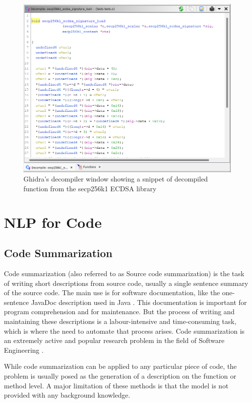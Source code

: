 \label{fig:decompiler}
\begin{figure}[H]
  \centering
  \includegraphics[width=\linewidth]{img/decompiler.png}
  \caption{Ghidra's decompiler window showing a snippet of decompiled function from the secp256k1 ECDSA library}
\end{figure}

\newpage
\section{NLP for Code}

\subsection{Code Summarization}
Code summarization (also referred to as Source code summarization) is the task of writing short descriptions from source code, usually a single sentence summary of the source code. The main use is for software documentation, like the one-sentence JavaDoc description used in Java \cite{leclair_recommendations}. This documentation is important for program comprehension and for maintenance. But the process of writing and maintaining these descriptions is a labour-intensive and time-consuming task, which is where the need to automate that process arises. Code summarization is an extremely active and popular research problem in the field of Software Engineering \cite{leclair_recommendations}.

While code summarization can be applied to any particular piece of code, the problem is usually posed as the generation of a description on the function or method level. A major limitation of these methods is that the model is not provided with any background knowledge. 

